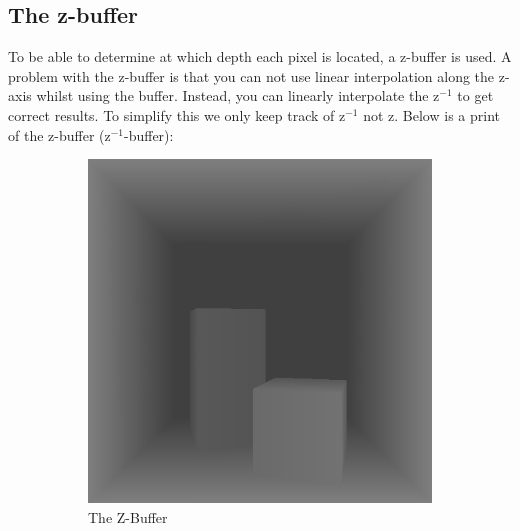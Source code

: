 \documentclass[a4paper,11pt]{article}
\begin{document}
\subsection{The z-buffer}
To be able to determine at which depth each pixel is located, a z-buffer is used. A problem with the z-buffer is that you can not use linear interpolation along the z-axis whilst using the buffer. Instead, you can linearly interpolate the z$^{-1}$ to get correct results. To simplify this we only keep track of z$^{-1}$ not z. Below is a print of the z-buffer (z$^{-1}$-buffer):
\begin{figure}[h!]
	\centering
	\begin{subfigure}[h]{0.4\linewidth}
		\centering
		\includegraphics[width=\linewidth]{screenshotz.png}
		\caption{The Z-Buffer}
		\label{figz}
	\end{subfigure}
	\begin{subfigure}[h!]{0.4\linewidth}
		\centering

\end{subfigure}
\end{figure}
\end{document}
